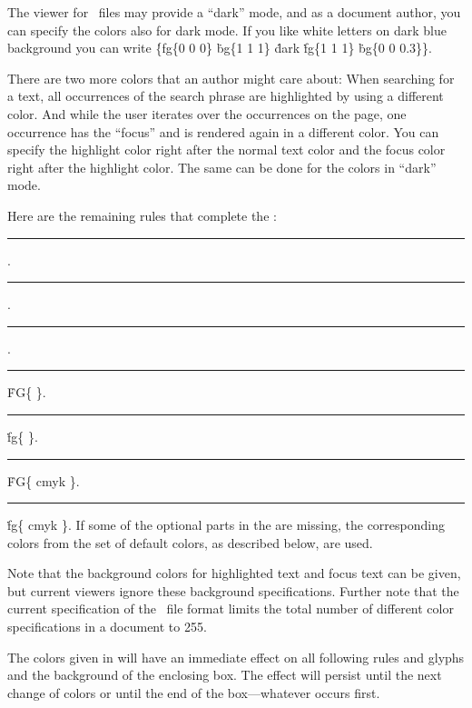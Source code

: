The viewer for \HINT\ files may provide a ``dark'' mode, and as a document
author, you can specify the colors also for dark mode.
If you like white letters on dark blue background you can write
\.{\{fg\{0 0 0\}} \.{bg\{1 1 1\}}
\.{dark} \.{fg\{1 1 1\}} \.{bg\{0 0 0.3\}\}}.

There are two more colors that an author might care about: When searching
for a text, all occurrences of the search phrase are highlighted by
using a different color. And while the user iterates over the occurrences
on the page, one occurrence has the ``focus'' and is rendered again in a
different color. You can specify the highlight color right after
the normal text color and the focus color right after the highlight color.
The same can be done for the colors in ``dark'' mode.

Here are the remaining rules that complete the :

\medskip
{}
\rule{}:  .
\rule{}:
     .
\rule{}:
     .
\rule{}:
   \.{FG\{      \}}.
\rule{}:
   \.{fg\{      \}}.
\rule{}:
   \.{FG\{ cmyk      \}}.
\rule{}:
  \.{fg\{ cmyk      \}}.
\medskip
If some of the optional parts in the  are missing,
the corresponding colors from the set of default colors, as described below,
are used.

Note that the background colors for highlighted text and focus text
can be given, but current viewers ignore these background specifications.
Further note that the current specification of the \HINT\ file format
limits the total number of different color specifications in a document to 255.


The colors given in  will have an immediate effect
on all following rules and glyphs and the background of the enclosing box.
The effect will persist until the next change of colors or until
the end of the box---whatever occurs first.

